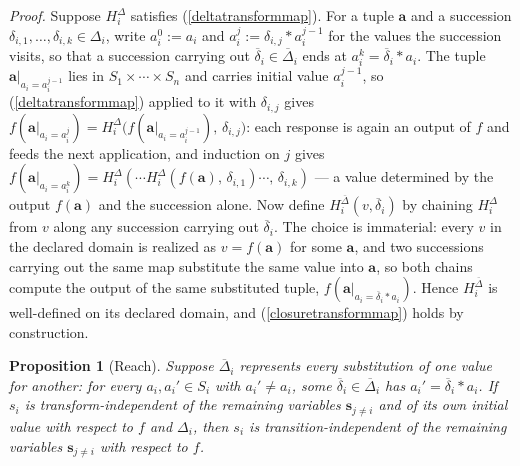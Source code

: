 \documentclass{article}
\newtheorem{proposition}{Proposition}
\theoremstyle{definition}
\theoremstyle{remark}
\begin{document}
\noindent \textit{Proof.} Suppose $H_i^\Delta$ satisfies (\ref{deltatransformmap}). For a tuple $\boldsymbol{a}$ and a succession $\delta_{i,1}, \ldots, \delta_{i,k} \in \Delta_i$, write $a_i^{0} := a_i$ and $a_i^{j} := \delta_{i,j} \ast a_i^{j-1}$ for the values the succession visits, so that a succession carrying out $\overline{\delta}_i \in \overline{\Delta}_i$ ends at $a_i^{k} = \overline{\delta}_i \ast a_i$. The tuple $\boldsymbol{a}|_{a_i = a_i^{j-1}}$ lies in $S_1 \times \cdots \times S_n$ and carries initial value $a_i^{j-1}$, so (\ref{deltatransformmap}) applied to it with $\delta_{i,j}$ gives $f(\boldsymbol{a}|_{a_i = a_i^{j}}) = H_i^\Delta\bigl(f(\boldsymbol{a}|_{a_i = a_i^{j-1}}),\, \delta_{i,j}\bigr)$: each response is again an output of $f$ and feeds the next application, and induction on $j$ gives $f(\boldsymbol{a}|_{a_i = a_i^{k}}) = H_i^\Delta(\cdots H_i^\Delta(f(\boldsymbol{a}),\, \delta_{i,1}) \cdots,\, \delta_{i,k})$ --- a value determined by the output $f(\boldsymbol{a})$ and the succession alone. Now define $H_i^{\overline{\Delta}}(v, \overline{\delta}_i)$ by chaining $H_i^\Delta$ from $v$ along any succession carrying out $\overline{\delta}_i$. The choice is immaterial: every $v$ in the declared domain is realized as $v = f(\boldsymbol{a})$ for some $\boldsymbol{a}$, and two successions carrying out the same map substitute the same value into $\boldsymbol{a}$, so both chains compute the output of the same substituted tuple, $f(\boldsymbol{a}|_{a_i = \overline{\delta}_i \ast a_i})$. Hence $H_i^{\overline{\Delta}}$ is well-defined on its declared domain, and (\ref{closuretransformmap}) holds by construction.

\begin{proposition}[Reach]
\label{reachproposition}
Suppose $\overline{\Delta}_i$ represents every substitution of one value for another: for every $a_i, a_i' \in S_i$ with $a_i' \neq a_i$, some $\overline{\delta}_i \in \overline{\Delta}_i$ has $a_i' = \overline{\delta}_i \ast a_i$. If $s_i$ is transform-independent of the remaining variables $\boldsymbol{s}_{j \neq i}$ and of its own initial value with respect to $f$ and $\Delta_i$, then $s_i$ is transition-independent of the remaining variables $\boldsymbol{s}_{j \neq i}$ with respect to $f$.
\end{proposition}
\end{document}
